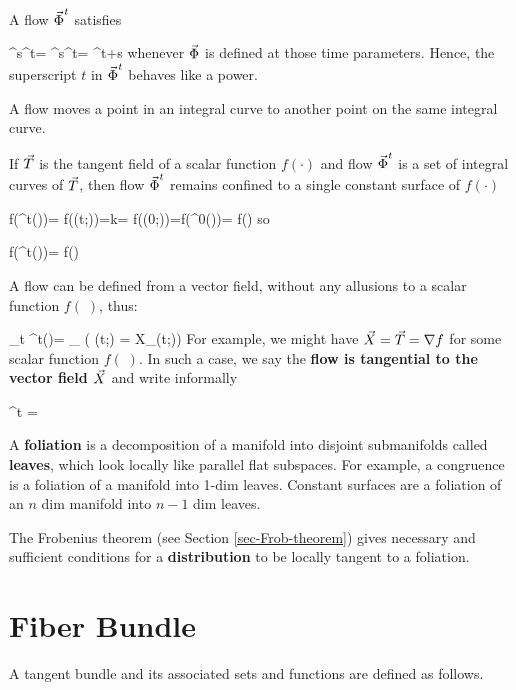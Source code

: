 A flow ${\vec{\Phi}}^t$
satisfies

\beq
\vPhi^s\vPhi^t=
\vPhi^s\circ\vPhi^t=
\vPhi^{t+s}
\eeq
whenever ${\vec{\Phi}}$ 
is defined at those time parameters.
Hence, the superscript $t$
in ${\vec{\Phi}}^t$
behaves like a power.

A flow moves a point in an integral
curve to another point
on the same
integral curve. 

If ${\vec{T}}$ is the tangent field of a scalar function $f(\cdot)$ and
flow ${\vec{\Phi}}^t$ 
is a set of integral curves 
of ${\vec{T}}$, then 
flow  ${\vec{\Phi}}^t$
remains confined to a single constant surface
of  $f(\cdot)$

\beq
f(\vPhi^t(\pi))=
f(\vgamma(t;\pi))=k= f(\vgamma(0;\pi))=f(\Phi^0(\pi))= f(\pi)
\eeq
so

\beq
f(\vPhi^t(\pi))= f(\pi)
\eeq

A flow can be defined from a vector field,
without
any allusions to a scalar function $f(\;)$, thus:

\beq
\partial_t \vPhi^t(\pi)=
\vecX_\pi
\quad(
\dot{\vgamma}(t;\pi) = X_{\vgamma(t;\pi)})
\eeq
For example, we might have ${\vec{X}}={\vec{T}}=\nabla f$ for some scalar function $f(\;)$.
In such a case,
we say the {\bf flow 
is  tangential to
the vector field ${\vec{X}}$} and write informally

\beq
\vPhi^t =  \vecX
\eeq


A {\bf foliation} is a decomposition of a manifold into disjoint submanifolds called {\bf leaves}, which look  locally like parallel flat subspaces.
For example, a congruence
is a foliation of a manifold into 
1-dim leaves. Constant surfaces are a
foliation of an $n$ dim manifold into 
$n-1$ dim leaves.

The Frobenius theorem (see Section \ref{sec-Frob-theorem}) gives necessary and sufficient conditions for a {\bf distribution} to be locally tangent to a foliation.


\section{Fiber Bundle}
\label{sec-fiber-bundle}

A tangent bundle and
its associated sets and functions
are defined as follows.

